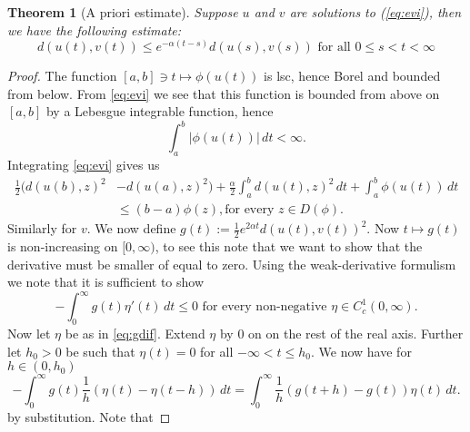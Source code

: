 \documentclass[a4paper,11pt, leqno]{scrreprt} %
\renewcommand{\leq}{\leqslant}
\renewcommand{\leq}{\leqslant}
\theoremstyle{change}
\newcounter{acounter}[chapter]
\newtheorem{theorem}[acounter]{Theorem}
\theoremstyle{nonumberplain}
\newtheorem{proof}{Proof}
\begin{document}
\begin{theorem}[A priori estimate]\label{th:apriori}
Suppose $u$ and $v$ are solutions to (\eqref{eq:evi}), then we have the
following estimate:
\begin{equation}
  d(u(t), v(t)) \leq e^{-\alpha (t - s)} d(u(s), v(s)) \text{ for all
    $0 \leq s < t < \infty$}
\end{equation}
\end{theorem}

\begin{proof}
The function $[a,b] \ni t \mapsto \phi(u(t))$ is lsc, hence Borel and
bounded from below. From \eqref{eq:evi} we see that this function is
bounded from above on $[a,b]$ by a Lebesgue integrable function, hence
\begin{equation*}
  \int_a^b |\phi(u(t))| \, dt < \infty.
\end{equation*}
Integrating \eqref{eq:evi} gives us
\begin{equation}\label{eq:intevi}
\begin{split}
 \frac12 (d(u(b),z)^2 &- d(u(a), z)^2) + \frac\alpha2 \int_a^b d(u(t),
 z)^2 \, dt + \int_a^b \phi(u(t)) \, dt\\
 &\leq (b - a) \phi(z), \text{
   for every $z \in D(\phi)$.} 
\end{split}
\end{equation}
Similarly for $v$. We now define $g(t) := \frac12 e^{2 \alpha t}
d(u(t), v(t))^2$. Now $t \mapsto g(t)$ is non-increasing on $[0,
\infty)$, to see this note that we want to show that the derivative
must be smaller of equal to zero. Using the weak-derivative formulism
we note that it is sufficient to show
\begin{equation}\label{eq:gdif}
- \int_0^\infty g(t) \eta'(t) \, dt \leq 0 \text{ for every non-negative
  $\eta \in C_c^1(0, \infty)$.}
\end{equation}
Now let $\eta$ be as in \eqref{eq:gdif}. Extend $\eta$ by $0$ on on the
rest of the real axis. Further let $h_0 > 0$ be such that $\eta(t) =
0$ for all $-\infty < t \leq h_0$. We now have for $h \in (0, h_0)$
\begin{equation}
  - \int_0^\infty g(t) \frac1h (\eta(t) - \eta(t - h)) \, dt =
  \int_0^\infty \frac1h (g(t + h) - g(t)) \eta(t) \, dt.
\end{equation}
by substitution. Note that


\end{proof}
\end{document}
